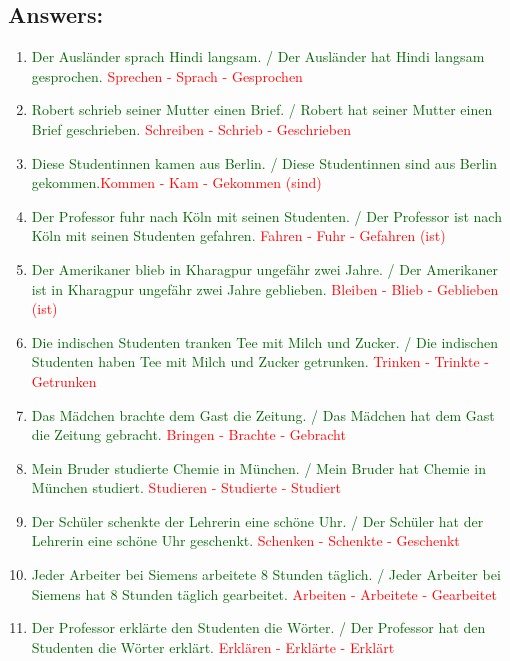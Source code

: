 \documentclass[12pt]{article}
\begin{document}
\subsection*{Answers:}
\begin{enumerate}
    \item \textcolor{darkgreen}{Der Ausländer sprach Hindi langsam. / Der Ausländer hat Hindi langsam gesprochen.} \textcolor{red}{Sprechen - Sprach - Gesprochen}
    \item \textcolor{darkgreen}{Robert schrieb seiner Mutter einen Brief. / Robert hat seiner Mutter einen Brief geschrieben.} \textcolor{red}{Schreiben - Schrieb - Geschrieben}
    \item \textcolor{darkgreen}{Diese Studentinnen kamen aus Berlin. / Diese Studentinnen sind aus Berlin gekommen.}\textcolor{red}{Kommen - Kam - Gekommen (sind)}
    \item \textcolor{darkgreen}{Der Professor fuhr nach Köln mit seinen Studenten. / Der Professor ist nach Köln mit seinen Studenten gefahren.} \textcolor{red}{Fahren - Fuhr - Gefahren (ist)}
    \item \textcolor{darkgreen}{Der Amerikaner blieb in Kharagpur ungefähr zwei Jahre. / Der Amerikaner ist in Kharagpur ungefähr zwei Jahre geblieben.} \textcolor{red}{Bleiben - Blieb - Geblieben (ist)}
    \item \textcolor{darkgreen}{Die indischen Studenten tranken Tee mit Milch und Zucker. / Die indischen Studenten haben Tee mit Milch und Zucker getrunken.} \textcolor{red}{Trinken - Trinkte - Getrunken}
    \item \textcolor{darkgreen}{Das Mädchen brachte dem Gast die Zeitung. / Das Mädchen hat dem Gast die Zeitung gebracht.} \textcolor{red}{Bringen - Brachte - Gebracht}
    \item \textcolor{darkgreen}{Mein Bruder studierte Chemie in München. / Mein Bruder hat Chemie in München studiert.} \textcolor{red}{Studieren - Studierte - Studiert}
    \item \textcolor{darkgreen}{Der Schüler schenkte der Lehrerin eine schöne Uhr. / Der Schüler hat der Lehrerin eine schöne Uhr geschenkt.} \textcolor{red}{Schenken - Schenkte - Geschenkt}
    \item \textcolor{darkgreen}{Jeder Arbeiter bei Siemens arbeitete 8 Stunden täglich. / Jeder Arbeiter bei Siemens hat 8 Stunden täglich gearbeitet.} \textcolor{red}{Arbeiten - Arbeitete - Gearbeitet}
    \item \textcolor{darkgreen}{Der Professor erklärte den Studenten die Wörter. / Der Professor hat den Studenten die Wörter erklärt.} \textcolor{red}{Erklären - Erklärte - Erklärt}
\end{enumerate}
\vspace{1em}
\end{document}
